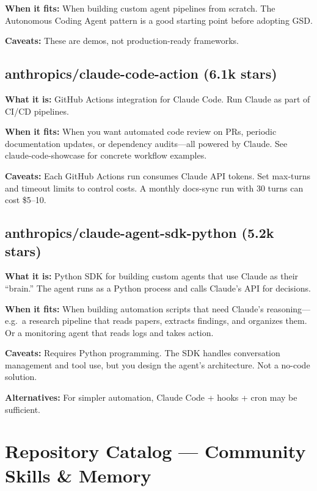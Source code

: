 \documentclass[11pt,a4paper]{article}
\begin{document}
\textbf{When it fits:} When building custom agent pipelines from scratch. The Autonomous Coding Agent pattern is a good starting point before adopting GSD.

\textbf{Caveats:} These are demos, not production-ready frameworks.

\subsection{anthropics/claude-code-action (6.1k stars)}

\textbf{What it is:} GitHub Actions integration for Claude Code. Run Claude as part of CI/CD pipelines.

\textbf{When it fits:} When you want automated code review on PRs, periodic documentation updates, or dependency audits---all powered by Claude. See claude-code-showcase for concrete workflow examples.

\textbf{Caveats:} Each GitHub Actions run consumes Claude API tokens. Set max-turns and timeout limits to control costs. A monthly docs-sync run with 30 turns can cost \$5--10.

\subsection{anthropics/claude-agent-sdk-python (5.2k stars)}

\textbf{What it is:} Python SDK for building custom agents that use Claude as their ``brain.'' The agent runs as a Python process and calls Claude's API for decisions.

\textbf{When it fits:} When building automation scripts that need Claude's reasoning---e.g.\ a research pipeline that reads papers, extracts findings, and organizes them. Or a monitoring agent that reads logs and takes action.

\textbf{Caveats:} Requires Python programming. The SDK handles conversation management and tool use, but you design the agent's architecture. Not a no-code solution.

\textbf{Alternatives:} For simpler automation, Claude Code + hooks + cron may be sufficient.

\newpage

\section{Repository Catalog --- Community Skills \& Memory}
\end{document}
